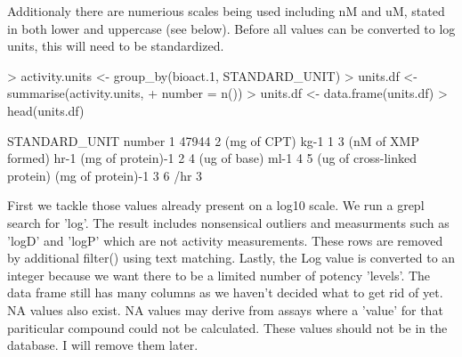 \documentclass{article}
\begin{document}
Additionaly there are numerious scales being used including nM and uM, stated in both lower and uppercase (see below).  Before all values can be converted to log units, this will need to be standardized.

\begin{Schunk}
\begin{Sinput}
> activity.units <- group_by(bioact.1, STANDARD_UNIT)
> units.df <-summarise(activity.units, 
+                      number = n())
> units.df <- data.frame(units.df)
> head(units.df)
\end{Sinput}
\begin{Soutput}
                                   STANDARD_UNIT number
1                                                 47944
2                               (mg of CPT) kg-1      1
3      (nM of XMP formed) hr-1 (mg of protein)-1      2
4                              (ug of base) ml-1      4
5 (ug of cross-linked protein) (mg of protein)-1      3
6                                            /hr      3
\end{Soutput}
\end{Schunk}

First we tackle those values already present on a log10 scale.  We run a grepl search for 'log'.  The result includes nonsensical outliers and measurments such as 'logD' and 'logP' which are not activity measurements.  These rows are removed by additional filter() using text matching.  Lastly, the Log value is converted to an integer because we want there to be a limited number of potency 'levels'.  The data frame still has many columns as we haven't decided what to get rid of yet. NA values also exist.  NA values may derive from assays where a 'value' for that pariticular compound could not be calculated.  These values should not be in the database.  I will remove them later.
\end{document}
